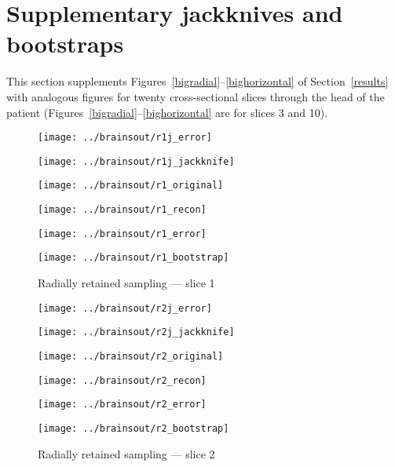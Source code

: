 \documentclass[review,supplement,onefignum,onetabnum,juq]{siamonline181217}
\begin{document}
\maketitle



\section{Supplementary jackknives and bootstraps}
\label{suppfigs}

This section supplements Figures~\ref{bigradial}--\ref{bighorizontal}
of Section~\ref{results} with analogous figures
for twenty cross-sectional slices through the head of the patient
(Figures~\ref{bigradial}--\ref{bighorizontal} are for slices 3 and 10).


\newlength{\vertsep}
\setlength{\vertsep}{.00in}
\newlength{\imsize}
\setlength{\imsize}{.32\textwidth}
\newlength{\imsizes}
\setlength{\imsizes}{.49\textwidth}


\begin{figure}
\begin{centering}

\parbox{\imsize}{\texttt{[image: ../brainsout/r1j\_error]}}
\parbox{\imsize}{\texttt{[image: ../brainsout/r1j\_jackknife]}}

\vspace{\vertsep}

\parbox{\imsize}{\texttt{[image: ../brainsout/r1\_original]}}
\parbox{\imsize}{\texttt{[image: ../brainsout/r1\_recon]}}

\vspace{\vertsep}

\parbox{\imsize}{\texttt{[image: ../brainsout/r1\_error]}}
\parbox{\imsize}{\texttt{[image: ../brainsout/r1\_bootstrap]}}

\end{centering}
\caption{Radially retained sampling --- slice 1}
\end{figure}


\begin{figure}
\begin{centering}

\parbox{\imsize}{\texttt{[image: ../brainsout/r2j\_error]}}
\parbox{\imsize}{\texttt{[image: ../brainsout/r2j\_jackknife]}}

\vspace{\vertsep}

\parbox{\imsize}{\texttt{[image: ../brainsout/r2\_original]}}
\parbox{\imsize}{\texttt{[image: ../brainsout/r2\_recon]}}

\vspace{\vertsep}

\parbox{\imsize}{\texttt{[image: ../brainsout/r2\_error]}}
\parbox{\imsize}{\texttt{[image: ../brainsout/r2\_bootstrap]}}

\end{centering}
\caption{Radially retained sampling --- slice 2}
\end{figure}
\end{document}
